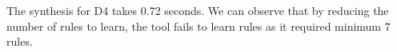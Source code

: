 The synthesis for D4 takes 0.72 seconds. We can observe that by reducing the number of rules to learn, the tool fails to learn rules as it required minimum 7 rules.










